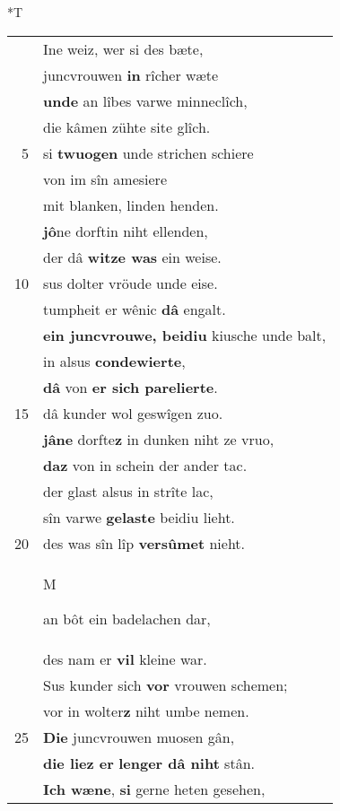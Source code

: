 \documentclass[8pt,a4paper,notitlepage]{article}
\begin{document}
\begin{table}[ht]
\hspace{0.5cm}
\begin{minipage}[t]{0.5\linewidth}
\small
\begin{center}*T
\end{center}
\begin{tabular}{rl}
 & Ine weiz, wer si des bæte,\\ 
 & juncvrouwen \textbf{in} rîcher wæte\\ 
 & \textbf{unde} an lîbes varwe minneclîch,\\ 
 & die kâmen zühte site glîch.\\ 
5 & si \textbf{twuogen} unde strichen schiere\\ 
 & von im sîn amesiere\\ 
 & mit blanken, linden henden.\\ 
 & \textbf{jô}ne dorftin niht ellenden,\\ 
 & der dâ \textbf{witze was} ein weise.\\ 
10 & sus dolter vröude unde eise.\\ 
 & tumpheit er wênic \textbf{dâ} engalt.\\ 
 & \textbf{ein juncvrouwe, beidiu} kiusche unde balt,\\ 
 & in alsus \textbf{condewierte},\\ 
 & \textbf{dâ} von \textbf{er sich parelierte}.\\ 
15 & dâ kunder wol geswîgen zuo.\\ 
 & \textbf{jâ}\textbf{ne} dorfte\textbf{z} in dunken niht ze vruo,\\ 
 & \textbf{daz} von in schein der ander tac.\\ 
 & der glast alsus in strîte lac,\\ 
 & sîn varwe \textbf{gelaste} beidiu lieht.\\ 
20 & des was sîn lîp \textbf{versûmet} nieht.\\ 
 & \begin{large}M\end{large}an bôt ein badelachen dar,\\ 
 & des nam er \textbf{vil} kleine war.\\ 
 & Sus kunder sich \textbf{vor} vrouwen schemen;\\ 
 & vor in wolter\textbf{z} niht umbe nemen.\\ 
25 & \textbf{Die} juncvrouwen muosen gân,\\ 
 & \textbf{die liez er} \textbf{lenger dâ niht} stân.\\ 
 & \textbf{Ich wæne}, \textbf{si} gerne heten gesehen,\\ 

\end{tabular}
\end{minipage}
\end{table}
\end{document}
